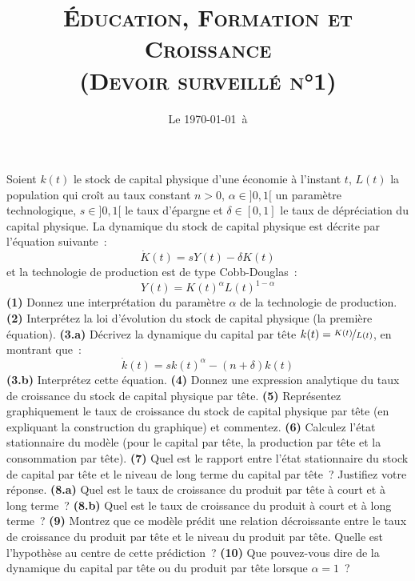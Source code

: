\documentclass[10pt,a4paper,notitlepage]{article}
\newcommand{\question}[1]{\textbf{(#1)}}
\begin{document}
\title{\textsc{Éducation, Formation et Croissance\\ \small{(Devoir surveillé n°1)}}}
\date{Le \today\ à \thistime}

\maketitle

Soient $k(t)$ le stock de capital physique d'une économie à l'instant $t$, $L(t)$ la population qui croît au taux constant $n>0$, $\alpha\in]0,1[$ un paramètre technologique, $s\in]0,1[$ le taux d'épargne et 
$\delta\in[0,1]$ le taux de dépréciation du capital physique. La dynamique du stock de capital physique est décrite par l'équation suivante :
\[
\dot K(t) = sY(t)-\delta K(t)
\]
et la technologie de production est de type Cobb-Douglas :
\[
Y(t) = K(t)^\alpha L(t)^{1-\alpha}
\]
\question{1} Donnez une interprétation du paramètre $\alpha$ de la technologie de production. \question{2} Interprétez la loi d'évolution du stock de capital physique (la première équation). \question{3.a} Décrivez la dynamique du capital par tête $k(t)=\nicefrac{K(t)}{L(t)}$, en montrant que :
\[
\dot k(t) = sk(t)^{\alpha}-(n+\delta)k(t)
\]
\question{3.b} Interprétez cette équation. \question{4} Donnez une expression analytique du taux de croissance du stock de capital physique par tête. \question{5} Représentez graphiquement le taux de croissance du stock de capital physique par tête (en expliquant la construction du graphique) et commentez. \question{6} Calculez l'état stationnaire du modèle (pour le capital par tête, la production par tête et la consommation par tête). \question{7} Quel est le rapport entre l'état stationnaire du stock de capital par tête et le niveau de long terme du capital par tête ? Justifiez votre réponse. \question{8.a} Quel est le taux de croissance du produit par tête à court et à long terme ? \question{8.b} Quel est le taux de croissance du produit à court et à long terme ? \question{9} Montrez que ce modèle prédit une relation décroissante entre le taux de croissance du produit par tête et le niveau du produit par tête. Quelle est l'hypothèse au centre de cette prédiction ? \question{10} Que pouvez-vous dire de la dynamique du capital par tête ou du produit par tête lorsque $\alpha=1$ ?  
\end{document}
